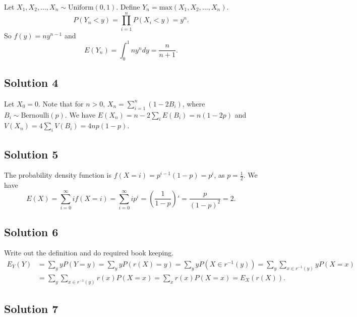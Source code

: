Let $X_1, X_2, ..., X_n \sim \mathrm{Uniform}(0, 1)$.
Define $Y_n = \mathrm{max}(X_1, X_2, ..., X_n)$.
\begin{equation*}
    P(Y_n < y) = \prod_{i=1}^n P(X_i < y)
        = y^n.
\end{equation*}
So $f(y) = ny^{n-1}$ and
\begin{equation*}
    E(Y_n) = \int_0^1 ny^{n} dy
        = \frac{n}{n + 1}.
\end{equation*}


\subsection*{Solution 4}

Let $X_0 = 0$.
Note that for $n > 0$, $X_n = \sum_{i = 1}^n (1 - 2B_i)$, where $B_i \sim \mathrm{Bernoulli}(p)$.
We have $E(X_n) = n - 2\sum_i E(B_i) = n(1 - 2p)$ and $V(X_n) = 4\sum_i V(B_i) = 4np(1-p)$.


\subsection*{Solution 5}

The probability density function is $f(X = i) = p^{i - 1} (1 - p) = p^i$, as $p = \frac{1}{2}$.
We have
\begin{equation*}
    E(X) = \sum_{i = 0}^{\infty} if(X = i)
        = \sum_{i = 0}^{\infty} i p^i
        = \left( \frac{1}{1 - p} \right)'
        = \frac{p}{(1 - p)^2}
        = 2.
\end{equation*}


\subsection*{Solution 6}

Write out the definition and do required book keeping.
\begin{equation*}
    \begin{split}
        E_Y(Y) &= \sum_y y P(Y = y)
            = \sum_y y P(r(X) = y)
            = \sum_y y P(X \in r^{-1}(y))
            = \sum_y \sum_{x \in r^{-1}(y)} y P(X = x) \\
            &= \sum_y \sum_{x \in r^{-1}(y)} r(x) P(X = x)
            = \sum_x r(x) P(X = x)
            = E_X(r(X)).
    \end{split}
\end{equation*}


\subsection*{Solution 7}

